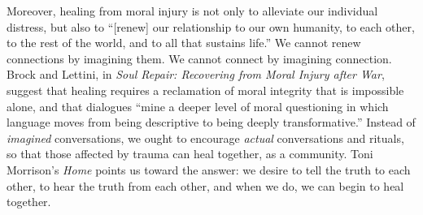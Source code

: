 \documentclass[12pt]{article}
\begin{document}
Moreover, healing from moral injury is not only to alleviate our individual
distress, but also to ``[renew] our relationship to our own humanity, to
each other, to the rest of the world, and to all that sustains
life.''\autocite[p.~116]{Brock12} We cannot renew connections by imagining them.
We cannot connect by imagining connection.  Brock and Lettini, in \textit{Soul
Repair: Recovering from Moral Injury after War},\autocite{Brock12} suggest that
healing requires a reclamation of moral integrity that is impossible alone, and
that dialogues ``mine a deeper level of moral questioning in which language
moves from being descriptive to being deeply
transformative.''\autocite[p.~112]{Brock12} Instead of \emph{imagined}
conversations, we ought to encourage \emph{actual} conversations and
rituals,\autocite{Brock15} so that those affected by trauma can heal together,
as a community. Toni Morrison's \emph{Home} points us toward the answer: we
desire to tell the truth to each other, to hear the truth from each other, and
when we do, we can begin to heal together.

\clearpage
\printbibliography

\end{document}

